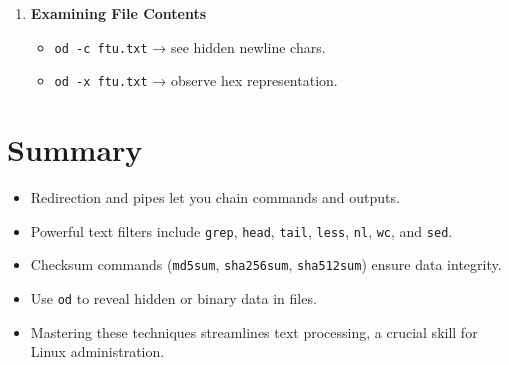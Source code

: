 \documentclass[a4paper]{report}
\begin{document}
\begin{enumerate}
    \item \textbf{Examining File Contents}
    \begin{itemize}
        \item \texttt{od -c ftu.txt} → see hidden newline chars.
        \item \texttt{od -x ftu.txt} → observe hex representation.
    \end{itemize}
\end{enumerate}

\section*{Summary}
\begin{itemize}
    \item Redirection and pipes let you chain commands and outputs.
    \item Powerful text filters include \texttt{grep}, \texttt{head}, \texttt{tail}, \texttt{less}, \texttt{nl}, \texttt{wc}, and \texttt{sed}.
    \item Checksum commands (\texttt{md5sum}, \texttt{sha256sum}, \texttt{sha512sum}) ensure data integrity.
    \item Use \texttt{od} to reveal hidden or binary data in files.
    \item Mastering these techniques streamlines text processing, a crucial skill for Linux administration.
\end{itemize}

\newpage
\end{document}
